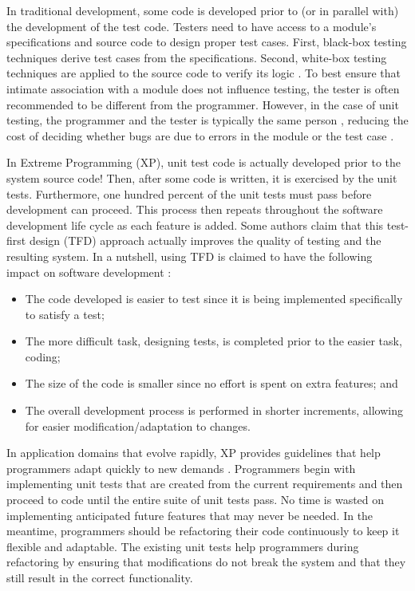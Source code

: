 In traditional development, some code is developed prior to (or in parallel
with) the development of the test code.  Testers need to have access to a
module's specifications and source code to design proper test cases.
First, black-box testing techniques derive test cases from the
specifications.  Second, white-box testing techniques are applied to the
source code to verify its logic \cite{Myers:1979}.  To best ensure that
intimate association with a module does not influence testing, the tester
is often recommended to be different from the programmer.  However, in the
case of unit testing, the programmer and the tester is typically the same
person \cite{Beizer:1990} \cite{Dalal:1993}, reducing the cost of deciding
whether bugs are due to errors in the module or the test case
\cite{Kaner:1999}.

In Extreme Programming (XP), unit test code is actually developed prior to
the system source code!  Then, after some code is written, it is exercised
by the unit tests.  Furthermore, one hundred percent of the unit tests must
pass before development can proceed.  This process then repeats throughout
the software development life cycle as each feature is added.  Some authors
claim that this test-first design (TFD) approach actually improves the
quality of testing and the resulting system.  In a nutshell, using TFD is
claimed to have the following impact on software development
\cite{Langr:2001}:

\begin{itemize}
  \item The code developed is easier to test since it is being implemented
        specifically to satisfy a test;
  \item The more difficult task, designing tests, is completed prior to the
        easier task, coding;
  \item The size of the code is smaller since no effort is spent on extra
        features; and
  \item The overall development process is performed in shorter increments,
        allowing for easier modification/adaptation to changes.
\end{itemize}
In application domains that evolve rapidly, XP provides guidelines that
help programmers adapt quickly to new demands \cite{Highsmith:2000}.
Programmers begin with implementing unit tests that are created from the
current requirements and then proceed to code until the entire suite of
unit tests pass.  No time is wasted on implementing anticipated future
features that may never be needed.  In the meantime, programmers should be
refactoring their code continuously to keep it flexible and adaptable.  The
existing unit tests help programmers during refactoring by ensuring that
modifications do not break the system and that they still result in the
correct functionality.

